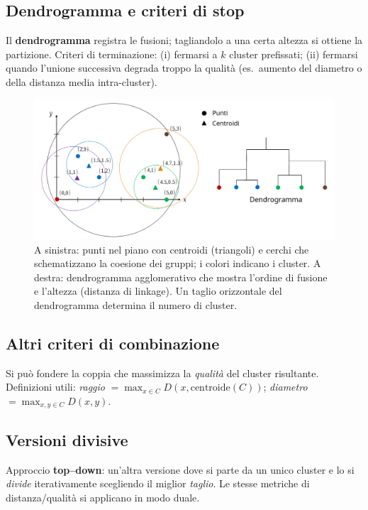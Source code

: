 \subsection{Dendrogramma e criteri di stop}\label{subsec:dendro}
Il \textbf{dendrogramma} registra le fusioni; tagliandolo a una certa altezza si ottiene la partizione.
Criteri di terminazione:
(i) fermarsi a $k$ cluster prefissati;
(ii) fermarsi quando l’unione successiva degrada troppo la qualità (es.\ aumento del diametro o della distanza media intra-cluster).

\begin{figure}
  \centering
  \includegraphics[width=\textwidth]{images/dendograms.png}
  \caption{A sinistra: punti nel piano con centroidi (triangoli) e cerchi che schematizzano la coesione dei gruppi; i colori indicano i cluster. A destra: dendrogramma agglomerativo che mostra l’ordine di fusione e l’altezza (distanza di linkage). Un taglio orizzontale del dendrogramma determina il numero di cluster.}
  \label{fig:dendograms}
\end{figure}

\subsection{Altri criteri di combinazione}\label{subsec:altri-criteri}
Si può fondere la coppia che massimizza la \emph{qualità} del cluster risultante.
Definizioni utili: \emph{raggio} $=\max_{x\in C} D(x,\mathrm{centroide}(C))$; \emph{diametro} $=\max_{x,y\in C} D(x,y)$.

\subsection{Versioni divisive}\label{subsec:divisive}
Approccio \textbf{top–down}: un'altra versione dove si parte da un unico cluster e lo si \emph{divide} iterativamente scegliendo il miglior \emph{taglio}. Le stesse metriche di distanza/qualità si applicano in modo duale.

